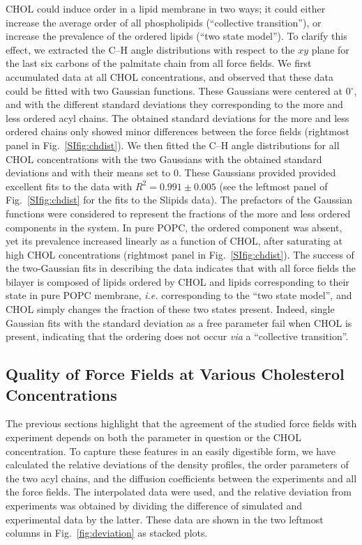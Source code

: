 \documentclass[aps,prl,superscriptaddress]{revtex4-2}
\begin{document}
CHOL could induce order in a lipid membrane in two ways; it could either increase the average order of all phospholipids (``collective transition''), or increase the prevalence of the ordered lipids (``two state model''). To clarify this effect, we extracted the C--H angle distributions with respect to the $xy$ plane for the last six carbons of the palmitate chain from all force fields. We first accumulated data at all CHOL concentrations, and observed that these data could be fitted with two Gaussian functions. These Gaussians were centered at 0$^\circ$, and with the different standard deviations they corresponding to the more and less ordered acyl chains. The obtained standard deviations for the more and less ordered chains only showed minor differences between the force fields (rightmost panel in Fig.~\ref{SIfig:chdist}). We then fitted the C--H angle distributions for all CHOL concentrations with the two Gaussians with the obtained standard deviations and with their means set to 0. These Gaussians provided provided excellent fits to the data with $R^2=0.991\pm 0.005$ (see the leftmost panel of Fig.~\ref{SIfig:chdist} for the fits to the Slipids data). The prefactors of the Gaussian functions were considered to represent the fractions of the more and less ordered components in the system. In pure POPC, the ordered component was absent, yet its prevalence increased linearly as a function of CHOL, after saturating at high CHOL concentrations (rightmost panel in Fig.~\ref{SIfig:chdist}). The success of the two-Gaussian fits in describing the data indicates that with all force fields the bilayer is composed of lipids ordered by CHOL and lipids corresponding to their state in pure POPC membrane, \textit{i.e.} corresponding to the ``two state model'', and CHOL simply changes the fraction of these two states present. Indeed, single Gaussian fits with the standard deviation as a free parameter fail when CHOL is present, indicating that the ordering does not occur \textit{via} a ``collective transition''.

\subsection{Quality of Force Fields at Various Cholesterol Concentrations}

The previous sections highlight that the agreement of the studied force fields with experiment depends on both the parameter in question or the CHOL concentration. To capture these features in an easily digestible form, we have calculated the relative deviations of the density profiles, the order parameters of the two acyl chains, and the diffusion coefficients between the experiments and all the force fields. The interpolated data were used, and the relative deviation from experiments was obtained by dividing the difference of simulated and experimental data by the latter. These data are shown in the two leftmost columns in Fig.~\ref{fig:deviation} as stacked plots.
\end{document}
